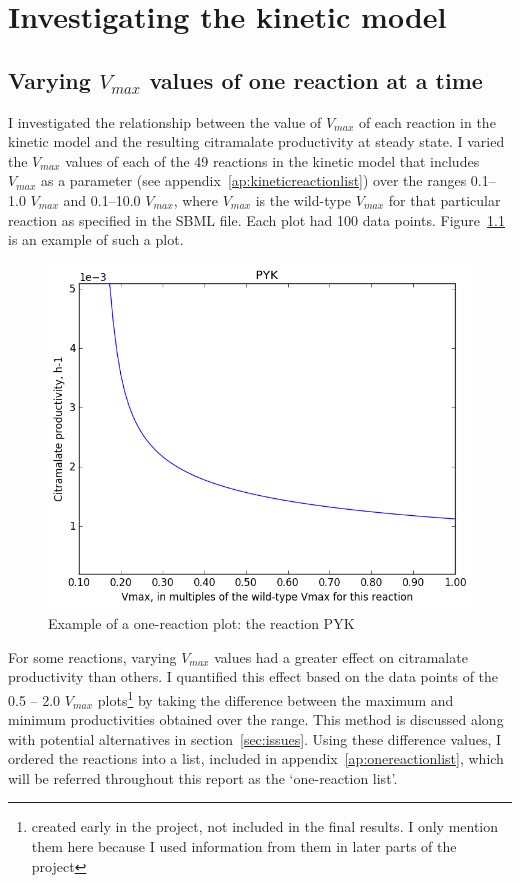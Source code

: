 \documentclass[parskip=full, numbers=noenddot]{scrreprt}
\begin{document}
\chapter{Investigating the kinetic model}
\label{ch:kinetic}

\section{Varying $V_{max}$ values of one reaction at a time}
\label{sec:onereac}

I investigated the relationship between the value of $V_{max}$ of each reaction in the kinetic model and the resulting citramalate productivity at steady state. I varied the $V_{max}$ values of each of the 49 reactions in the kinetic model that includes $V_{max}$ as a parameter (see appendix~\ref{ap:kineticreactionlist}) over the ranges 0.1--1.0 $V_{max}$ and 0.1--10.0 $V_{max}$, where $V_{max}$ is the wild-type $V_{max}$ for that particular reaction as specified in the SBML file. Each plot had 100 data points. Figure~\ref{fig:onereacsample} is an example of such a plot.

\begin{figure}[htbp]
  \centering
  \includegraphics[scale=0.5]{onereacsample}
  \caption{Example of a one-reaction plot: the reaction PYK}
  \label{fig:onereacsample}
\end{figure}

For some reactions, varying $V_{max}$ values had a greater effect on citramalate productivity than others. I quantified this effect based on the data points of the 0.5 -- 2.0 $V_{max}$ plots\footnote{created early in the project, not included in the final results. I only mention them here because I used information from them in later parts of the project} by taking the difference between the maximum and minimum productivities obtained over the range. This method is discussed along with potential alternatives in section~\ref{sec:issues}. Using these difference values, I ordered the reactions into a list, included in appendix~\ref{ap:onereactionlist}, which will be referred throughout this report as the `one-reaction list'.
\end{document}
